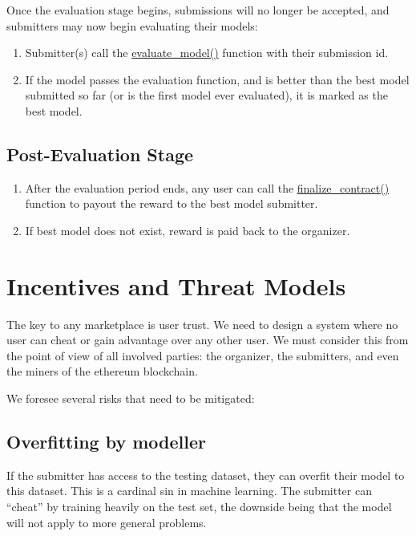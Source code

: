 \documentclass{article}
\begin{document}
Once the evaluation stage begins, submissions will no longer be accepted, and submitters may now begin evaluating their models:

\begin{enumerate}
\item Submitter(s) call the \underline{evaluate\_model()} function with their submission id.
\item If the model passes the evaluation function, and is better than the best model submitted so far (or is the first model ever evaluated), it is marked as the best model.
\end{enumerate}

\subsection{Post-Evaluation Stage}

\begin{enumerate}
\item After the evaluation period ends, any user can call the \underline{finalize\_contract()} function to payout the reward to the best model submitter.
\item If best model does not exist, reward is paid back to the organizer.
\end{enumerate}

\section{Incentives and Threat Models}
\label{incentives_and_threat_models}

The key to any marketplace is user trust. We need to design a system where no user can cheat or gain advantage over any other user. We must consider this from the point of view of all involved parties: the organizer, the submitters, and even the miners of the ethereum blockchain.

We foresee several risks that need to be mitigated:

\subsection{Overfitting by modeller}

If the submitter has access to the testing dataset, they can overfit their model to this dataset. This is a cardinal sin in machine learning. The submitter can “cheat” by training heavily on the test set, the downside being that the model will not apply to more general problems.
\end{document}
